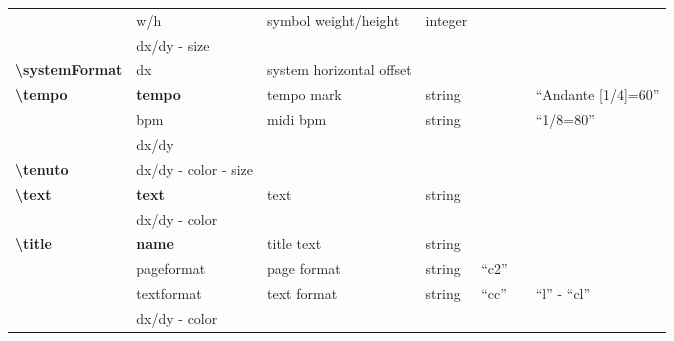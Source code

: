 \documentclass[a4paper, landscape, 10pt]{article}
\begin{document}
\begin{tabularx}{\linewidth}{p{3cm}p{3cm}p{5cm}p{3cm}p{2.5cm}p{3.5cm}p{4cm}}
    &w/h&symbol weight/height&integer&&&\\
    &dx/dy - size&&&&&\\
    \hline
    \textbf{\textbackslash{}systemFormat}&dx&system horizontal offset&&&&\\
    \hline
    \textbf{\textbackslash{}tempo}&\textbf{tempo}&tempo mark&string&&&``Andante [1/4]=60''\\
    &bpm&midi bpm&string&&&``1/8=80''\\
    &dx/dy&&&&&\\
    \hline
    \textbf{\textbackslash{}tenuto}&dx/dy - color - size&&&&&\\
    \hline
    \textbf{\textbackslash{}text}&\textbf{text}&text&string&&&\\
    &dx/dy - color&&&&&\\
    \hline
    \textbf{\textbackslash{}title}&\textbf{name}&title text&string&&&\\
    &pageformat&page format&string&``c2''&&\\ %
    &textformat&text format&string&``cc''&&``l'' - ``cl''\\ %
    &dx/dy - color&&&&&\\
    \hline
\end{tabularx}
\end{document}
